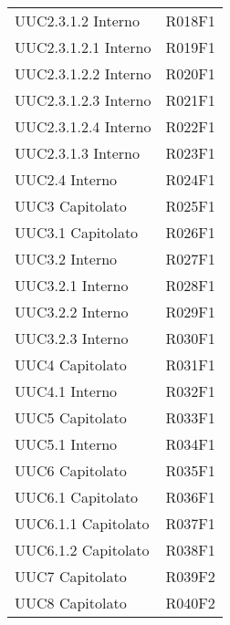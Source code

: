 \documentclass[../analisi-dei-requisiti.tex]{subfiles}
\begin{document}
\begin{longtable}[H]{ p{4cm} | p{4cm} }
  UUC2.3.1.2 Interno            & R018F1                               \\
  UUC2.3.1.2.1 Interno          & R019F1                               \\
  UUC2.3.1.2.2 Interno          & R020F1                               \\
  UUC2.3.1.2.3 Interno          & R021F1                               \\
  UUC2.3.1.2.4 Interno          & R022F1                               \\
  UUC2.3.1.3 Interno            & R023F1                               \\
  UUC2.4 Interno                & R024F1                               \\
  UUC3 Capitolato               & R025F1                               \\
  UUC3.1 Capitolato             & R026F1                               \\
  UUC3.2 Interno                & R027F1                               \\
  UUC3.2.1 Interno              & R028F1                               \\
  UUC3.2.2 Interno              & R029F1                               \\
  UUC3.2.3 Interno              & R030F1                               \\
  UUC4 Capitolato               & R031F1                               \\
  UUC4.1 Interno                & R032F1                               \\
  UUC5 Capitolato               & R033F1                               \\
  UUC5.1 Interno                & R034F1                               \\
  UUC6 Capitolato               & R035F1                               \\
  UUC6.1 Capitolato             & R036F1                               \\
  UUC6.1.1 Capitolato           & R037F1                               \\
  UUC6.1.2 Capitolato           & R038F1                               \\
  UUC7 Capitolato               & R039F2                               \\
  UUC8 Capitolato               & R040F2                               \\

\end{longtable}
\end{document}
